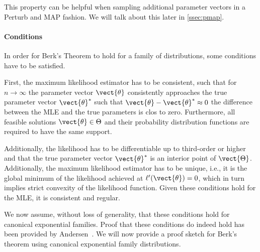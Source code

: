         This property can be helpful when sampling additional parameter vectors in a Perturb and MAP fashion. We will talk about this later in \sect \ref{ssec:pmap}.
        
        \paragraph*{Conditions}
        In order for Berk's Theorem to hold for a family of distributions, some conditions have to be satisfied.

        First, the maximum likelihood estimator has to be consistent, such that for $n\rightarrow \infty$ the parameter vector $\vect{\theta}$ consistently approaches the true parameter vector $\vect{\theta}^*$ such that $\vect{\theta} - \vect{\theta}^* \approx 0$ the difference between the MLE and the true parameters is clos to zero.
        Furthermore, all feasible solutions $\vect{\theta}  \in \Theta$ and their probability distribution functions are required to have the same support.
        
        Additionally, the likelihood has to be differentiable up to third-order or higher and that the true parameter vector $\vect{\theta}^*$ is an interior point of $\vect{\Theta}$.
        Additionally, the maximum likelihood estimator has to be unique, i.e., it is the global minimum of the likelihood achieved at $\ell'(\vect{\theta}) = 0$, which in turn implies strict convexity of the likelihood function.
        Given these conditions hold for the MLE, it is consistent and regular.

        We now assume, without loss of generality, that these conditions hold for canonical exponential families.
        Proof that these conditions do indeed hold has been provided by Andersen~\cite{andersen1970asymptotic}.
        We will now provide a proof sketch for Berk's theorem using canonical exponential family distributions.


